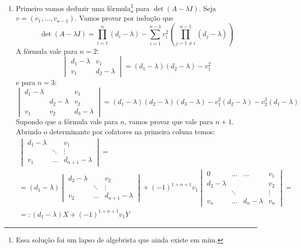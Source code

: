 \documentclass[a4paper,12pt]{article}
\begin{document}
\begin{enumerate}
    \item[\textcircled{4}] Primeiro vamos deduzir uma fórmula\footnote{Essa solução foi um lapso de algebrista que ainda existe em mim.} para $\det(A - \lambda I)$. Seja $v = (v_1, \dots, v_{n-1})$. Vamos provar por indução que
    \[\tag{$\dagger$}
    \det(A - \lambda I) = \prod_{i=1}^{n} (d_i - \lambda) - \sum_{i=1}^{n-1} v_i^2 \left( \prod_{j = 1 \neq i }^{n-1} (d_j - \lambda) \right)
    \]
    A fórmula vale para $n=2$:
    \[
    \begin{vmatrix} d_1 - \lambda & v_1 \\ v_1 & d_2 - \lambda \end{vmatrix} = (d_1 - \lambda)(d_2 - \lambda) - v_1^2
    \]
    e para $n=3$:
    \[
    \begin{vmatrix} 
        d_1 - \lambda &  & v_1 \\
          & d_2 - \lambda &  v_2 \\ 
          v_1 & v_2 & d_3 - \lambda 
        \end{vmatrix} = (d_1 - \lambda)(d_2 - \lambda)(d_3 - \lambda) - v_1^2(d_2 - \lambda) - v_2^2(d_1 - \lambda)
    \]
    Supondo que a fórmula vale para $n$, vamos provar que vale para $n+1$. Abrindo o determinante por cofatores na primeira coluna temos:
    \begin{multline*}
        \begin{vmatrix}  
        d_1 - \lambda &  & v_1 \\
            & \ddots &  \vdots \\ 
        v_1 & \ldots & d_{n+1} - \lambda  
    \end{vmatrix} = \\ =
    (d_1 - \lambda) \begin{vmatrix}  
        d_2 - \lambda &  & v_2 \\
            & \ddots &  \vdots \\ 
        v_2 & \ldots & d_{n+1} - \lambda  
    \end{vmatrix} + (-1)^{1+n+1} v_1 \begin{vmatrix} 0 & \ldots & \ldots & v_1 \\ d_2 - \lambda &  &  & v_2 \\  & \ddots &  & \vdots \\ v_n & \ldots & d_n - \lambda & v_n \end{vmatrix}    = \\ =:  (d_1 - \lambda)X + (-1)^{1+n+1} v_1 Y
    \end{multline*}


\end{enumerate}
\end{document}

